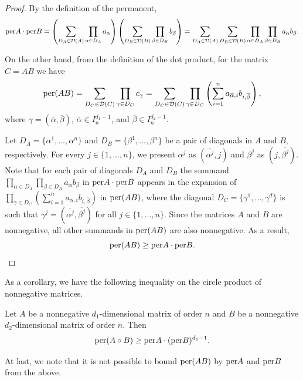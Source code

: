 \documentclass[a4paper]{article}
\begin{document}
\begin{proof}
By the definition of the permanent,
$${\rm per} A \cdot {\rm per} B = \left(\sum\limits_{D_A \in \mathcal{D}(A)}  \prod\limits_{\alpha \in D_A} a_{\alpha} \right)  \left(\sum\limits_{D_B \in \mathcal{D}(B)}  \prod\limits_{\beta \in D_B} b_{\beta} \right) =  \sum\limits_{D_A \in \mathcal{D}(A)}  \sum\limits_{D_B \in \mathcal{D}(B)}   \prod\limits_{\alpha \in D_A}   \prod\limits_{\beta \in D_B}  a_{\alpha} b_{\beta}.$$

On the other hand, from the definition of the dot product, for the matrix $C = AB$ we have
$${\rm per} (AB) = \sum\limits_{D_C \in \mathcal{D} (C)} \prod\limits_{\gamma \in D_C} c_\gamma = \sum\limits_{D_C \in \mathcal{D} (C)} \prod\limits_{\gamma \in D_C}  \left(  \sum\limits_{i=1}^n a_{\overline{\alpha},i} b_{i,\overline{\beta}} \right),$$
where $\gamma = ( \overline{\alpha},  \overline{\beta} )$,  $\overline{\alpha} \in I_{n}^{d_1 -1}$,  and $\overline{\beta} \in I_{n}^{d_2-1}$.

 Let $D_A = \{  \alpha^1, \ldots, \alpha^n\}$ and  $D_B = \{  \beta^1, \ldots, \beta^n\}$ be a pair of diagonals in $A$ and $B$, respectively.   For every $j \in \{ 1, \ldots, n\}$, we present $\alpha^j $ as $ (\overline{\alpha^j}, j)$ and $\beta^j $ as $ (j, \overline{\beta^j})$.
Note that for each pair of diagonals $D_A$ and $D_B$ the summand $ \prod\limits_{\alpha \in D_A}   \prod\limits_{\beta \in D_B}  a_{\alpha} b_{\beta} $ in ${\rm per} A \cdot {\rm per} B$ appears in  the expansion of $\prod\limits_{\gamma \in D_C}  \left(  \sum\limits_{i=1}^n a_{\overline{\alpha},i} b_{i,\overline{\beta}} \right)$ in ${\rm per} (AB)$, where the diagonal $D_C = \{ \gamma^1, \ldots, \gamma^d\}$  is such that $\gamma^j = (\overline{\alpha^j}, \overline{\beta^j}) $ for all $j \in \{ 1, \ldots, n\}$. Since the matrices $A$ and $B$ are nonnegative, all other summands in ${\rm per} (AB)$ are also nonnegative. As a result,
$${\rm per} (A B) \geq {\rm per} A \cdot {\rm per} B.$$
\end{proof}


As a corollary, we have the following inequality on the circle product of nonnegative matrices.

\begin{sled}
Let $A$ be a nonnegative $d_1$-dimensional matrix of order $n$ and $B$ be a nonnegative  $d_2$-dimensional matrix of order $n$. Then
$${\rm per} (A \circ B) \geq {\rm per} A \cdot ({\rm per} B)^{d_1-1}.$$
\end{sled}


At last, we note that it is not possible to bound ${\rm per} (AB)$ by ${\rm per} A$ and ${\rm per} B$ from the above.
\end{document}
